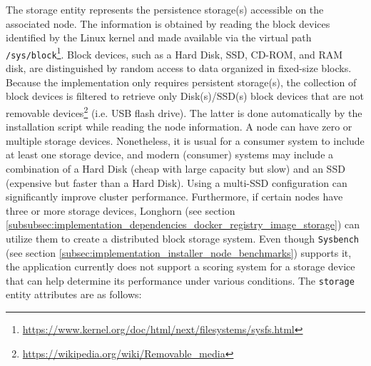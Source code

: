 The storage entity represents the persistence storage(s) accessible on the
associated node.
\newline
The information is obtained by reading the block devices identified by the Linux
kernel and made available via the virtual path \texttt{/sys/block}\footnote{\url{https://www.kernel.org/doc/html/next/filesystems/sysfs.html}}.
Block devices, such as a Hard Disk, SSD, CD-ROM, and RAM disk, are distinguished
by random access to data organized in fixed-size blocks\cite{block_device}. Because
the implementation only requires persistent storage(s), the collection of block devices
is filtered to retrieve only Disk(s)/SSD(s) block devices that are not removable
devices\footnote{\url{https://wikipedia.org/wiki/Removable_media}} (i.e. USB flash
drive). The latter is done automatically by the installation script while reading
the node information.
\newline
A node can have zero or multiple storage devices. Nonetheless, it is usual for a
consumer system to include at least one storage device, and modern (consumer) systems
may include a combination of a Hard Disk (cheap with large capacity but slow) and
an SSD (expensive but faster than a Hard Disk). Using a multi-SSD configuration
can significantly improve cluster performance. Furthermore, if certain nodes
have three or more storage devices, Longhorn (see section
\ref{subsubsec:implementation_dependencies_docker_registry_image_storage}) can utilize
them to create a distributed block storage system.
\newline
Even though \texttt{Sysbench} (see section
\ref{subsec:implementation_installer_node_benchmarks}) supports it, the
application currently does not support a scoring system for a storage device
that can help determine its performance under various conditions. The \texttt{storage}
entity attributes are as follows:

